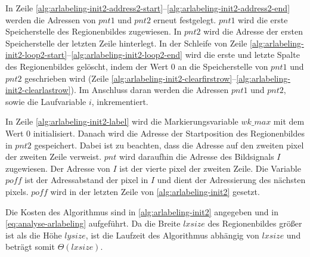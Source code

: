 

In Zeile \ref{alg:arlabeling-init2-address2-start}--\ref{alg:arlabeling-init2-address2-end} werden die Adressen
 von $\mathit{pnt1}$ und $\mathit{pnt2}$ erneut festgelegt. $\mathit{pnt1}$ wird die erste Speicherstelle des
 Regionenbildes zugewiesen. In $\mathit{pnt2}$ wird die Adresse der ersten Speicherstelle der letzten Zeile hinterlegt.
 In der Schleife von Zeile \ref{alg:arlabeling-init2-loop2-start}--\ref{alg:arlabeling-init2-loop2-end} wird die erste
 und letzte Spalte des Regionenbildes gelöscht, indem der Wert $0$ an die Speicherstelle von $\mathit{pnt1}$ und
 $\mathit{pnt2}$ geschrieben wird
 (Zeile \ref{alg:arlabeling-init2-clearfirstrow}--\ref{alg:arlabeling-init2-clearlastrow}). Im Anschluss daran werden
 die Adressen $\mathit{pnt1}$ und $\mathit{pnt2}$, sowie die Laufvariable $i$, inkrementiert.

In Zeile \ref{alg:arlabeling-init2-label} wird die Markierungsvariable $\mathit{wk\_max}$ mit dem Wert $0$
 initialisiert. Danach wird die Adresse der Startposition des Regionenbildes in $\mathit{pnt2}$ gespeichert. Dabei ist
 zu beachten, dass die Adresse auf den zweiten \gls{pixel} der zweiten Zeile verweist. $\mathit{pnt}$ wird daraufhin die
 Adresse des Bildsignals $I$ zugewiesen. Der Adresse von $I$ ist der vierte \gls{pixel} der zweiten Zeile. Die
 Variable $\mathit{poff}$ ist der Adressabstand der \gls{pixel} in $I$ und dient der Adressierung des nächsten
 \glspl{pixel}. $\mathit{poff}$ wird in der letzten Zeile von \autoref{alg:arlabeling-init2} gesetzt.

Die Kosten des Algorithmus sind in \autoref{alg:arlabeling-init2} angegeben und in \autoref{eq:analyse-arlabeling}
 aufgeführt. Da die Breite $\mathit{lxsize}$ des Regionenbildes größer ist als die Höhe $\mathit{lysize}$, ist die
 Laufzeit des Algorithmus abhängig von $\mathit{lxsize}$ und beträgt somit $\Theta{(\mathit{lxsize})}$.

